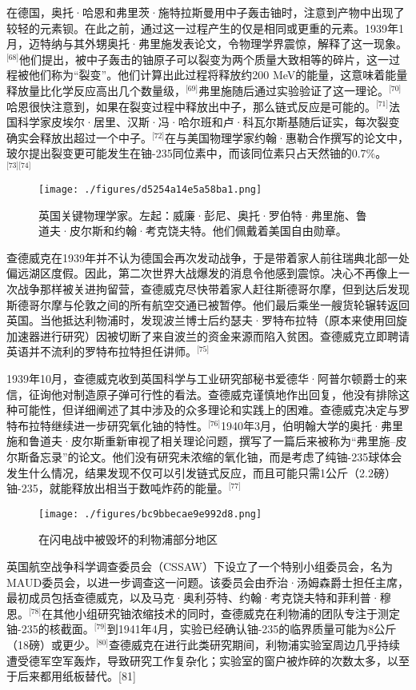 在德国，奥托·哈恩和弗里茨·施特拉斯曼用中子轰击铀时，注意到产物中出现了较轻的元素钡。在此之前，通过这一过程产生的仅是相同或更重的元素。1939年1月，迈特纳与其外甥奥托·弗里施发表论文，令物理学界震惊，解释了这一现象。\(^\text{[68]}\)他们提出，被中子轰击的铀原子可以裂变为两个质量大致相等的碎片，这一过程被他们称为“裂变”。他们计算出此过程将释放约200 MeV的能量，这意味着能量释放量比化学反应高出几个数量级，\(^\text{[69]}\)弗里施随后通过实验验证了这一理论。\(^\text{[70]}\)哈恩很快注意到，如果在裂变过程中释放出中子，那么链式反应是可能的。\(^\text{[71]}\)法国科学家皮埃尔·居里、汉斯·冯·哈尔班和卢·科瓦尔斯基随后证实，每次裂变确实会释放出超过一个中子。\(^\text{[72]}\)在与美国物理学家约翰·惠勒合作撰写的论文中，玻尔提出裂变更可能发生在铀-235同位素中，而该同位素只占天然铀的0.7\%。\(^\text{[73][74]}\)
\begin{figure}[ht]
\centering
\texttt{[image: ./figures/d5254a14e5a58ba1.png]}
\caption{英国关键物理学家。左起：威廉·彭尼、奥托·罗伯特·弗里施、鲁道夫·皮尔斯和约翰·考克饶夫特。他们佩戴着美国自由勋章。} \label{fig_ZMcdw_4}
\end{figure}
查德威克在1939年并不认为德国会再次发动战争，于是带着家人前往瑞典北部一处偏远湖区度假。因此，第二次世界大战爆发的消息令他感到震惊。决心不再像上一次战争那样被关进拘留营，查德威克尽快带着家人赶往斯德哥尔摩，但到达后发现斯德哥尔摩与伦敦之间的所有航空交通已被暂停。他们最后乘坐一艘货轮辗转返回英国。当他抵达利物浦时，发现波兰博士后约瑟夫·罗特布拉特（原本来使用回旋加速器进行研究）因被切断了来自波兰的资金来源而陷入贫困。查德威克立即聘请英语并不流利的罗特布拉特担任讲师。\(^\text{[75]}\)

1939年10月，查德威克收到英国科学与工业研究部秘书爱德华·阿普尔顿爵士的来信，征询他对制造原子弹可行性的看法。查德威克谨慎地作出回复，他没有排除这种可能性，但详细阐述了其中涉及的众多理论和实践上的困难。查德威克决定与罗特布拉特继续进一步研究氧化铀的特性。\(^\text{[76]}\)1940年3月，伯明翰大学的奥托·弗里施和鲁道夫·皮尔斯重新审视了相关理论问题，撰写了一篇后来被称为“弗里施–皮尔斯备忘录”的论文。他们没有研究未浓缩的氧化铀，而是考虑了纯铀-235球体会发生什么情况，结果发现不仅可以引发链式反应，而且可能只需1公斤（2.2磅）铀-235，就能释放出相当于数吨炸药的能量。\(^\text{[77]}\)
\begin{figure}[ht]
\centering
\texttt{[image: ./figures/bc9bbecae9e992d8.png]}
\caption{在闪电战中被毁坏的利物浦部分地区} \label{fig_ZMcdw_5}
\end{figure}
英国航空战争科学调查委员会（CSSAW）下设立了一个特别小组委员会，名为 MAUD委员会，以进一步调查这一问题。该委员会由乔治·汤姆森爵士担任主席，最初成员包括查德威克，以及马克·奥利芬特、约翰·考克饶夫特和菲利普·穆恩。\(^\text{[78]}\)在其他小组研究铀浓缩技术的同时，查德威克在利物浦的团队专注于测定铀-235的核截面。\(^\text{[79]}\)到1941年4月，实验已经确认铀-235的临界质量可能为8公斤（18磅）或更少。\(^\text{[80]}\)查德威克在进行此类研究期间，利物浦实验室周边几乎持续遭受德军空军轰炸，导致研究工作复杂化；实验室的窗户被炸碎的次数太多，以至于后来都用纸板替代。[81]

